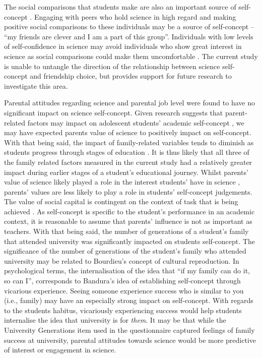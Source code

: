 The social comparisons that students make are also an important source of self-concept \cite{butz2015salient}. Engaging with peers who hold science in high regard and making positive social comparisons to these individuals may be a source of self-concept -- ``my friends are clever and I am a part of this group''. Individuals with low levels of self-confidence in science may avoid individuals who show great interest in science as social comparisons could make them uncomfortable \cite{bong1999comparison}. The current study is unable to untangle the direction of the relationship between science self-concept and friendship choice, but provides support for future research to investigate this area.   

Parental attitudes regarding science and parental job level were found to have no significant impact on science self-concept. Given research suggests that parent-related factors may impact on adolescent students' academic self-concept \cite{fan2010effects}, we may have expected parents value of science to positively impact on self-concept. With that being said, the impact of family-related variables tends to diminish as students progress through stages of education \cite{holm2011dealing}. It is thus likely that all three of the family related factors measured in the current study had a relatively greater impact during earlier stages of a student's educational journey. Whilst parents' value of science likely played a role in the interest students' have in science \cite{archer2013aspires}, parents' values are less likely to play a role in students' self-concept judgements. The value of social capital is contingent on the context of task that is being achieved \cite{Adler2017}. As self-concept is specific to the student's performance in an academic context, it is reasonable to assume that parents' influence is not as important as teachers. With that being said, the number of generations of a student's family that attended university was significantly impacted on students self-concept. The significance of the number of generations of the student's family who attended university may be related to Bourdieu's concept of cultural reproduction. In psychological terms, the internalisation of the idea that ``if my family can do it, so can I'', corresponds to Bandura's \cite{bandura1986explanatory} idea of establishing self-concept through vicarious experience. Seeing someone experience success who is similar to you (i.e., family) may have an especially strong impact on self-concept. With regards to the students habitus, vicariously experiencing success would help students internalise the idea that university is for \textit{them}. It may be that while the University Generations item used in the questionnaire captured feelings of family success at university, parental attitudes towards science would be more predictive of interest or engagement in science.  

